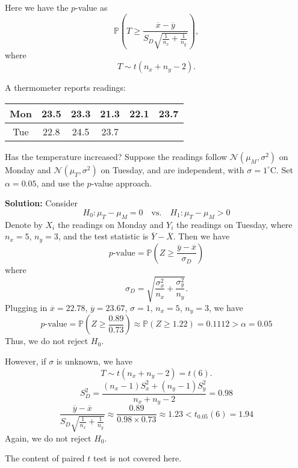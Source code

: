 Here we have the \(p\)-value as
\[
  \mathbb{P} \left( T \geq \frac{\overline{x} - \overline{y}}{S_D \sqrt{ \frac{1}{n_x} + \frac{1}{n_y} }} \right),
\]
where 
\[
  T \sim t(n_x + n_y - 2).
\]

\begin{eg}
  A thermometer reports readings: 
  \begin{table}[H]
    \centering
    \begin{tabular}{c|c|c|c|c|c}
        \toprule
        Mon & 23.5 & 23.3 & 21.3 & 22.1 & 23.7  \\
        \midrule
        Tue & 22.8 & 24.5 & 23.7 &  &   \\
        \bottomrule
    \end{tabular}
  \end{table}

  Has the temperature increased? Suppose the readings follow \(\mathcal{N}(\mu_M, \sigma^2)\) on Monday and \(\mathcal{N}(\mu_T, \sigma^2)\) on Tuesday, and are independent, with \(\sigma = 1^\circ \text{C}\). Set \(\alpha = 0.05\), and use the \(p\)-value approach.

  \textbf{Solution:} 
  Consider 
  \[
    H_0: \mu_T - \mu_M = 0 \quad \text{vs.} \quad H_1: \mu_T - \mu_M > 0
  \]
  Denote by \(X_i\) the readings on Monday and \(Y_i\) the readings on Tuesday, where \(n_x = 5\), \(n_y = 3\), and the test statistic is \(\overline{Y} - \overline{X}\). Then we have 
  \[
    p\text{-value} = \mathbb{P}\left(Z \geq \dfrac{\overline{y} - \overline{x}}{\sigma_D}\right)
  \]
  where 
  \[
    \sigma_D = \sqrt{\frac{\sigma_x^2}{n_x} + \frac{\sigma_y^2}{n_y}}.
  \]
  Plugging in \(\overline{x} = 22.78\), \(\overline{y} = 23.67\), \(\sigma = 1\), \(n_x = 5\), \(n_y = 3\), we have 
  \[
    p\text{-value} = \mathbb{P}\left(Z \geq \dfrac{0.89}{0.73}\right) \approx \mathbb{P}(Z \geq 1.22) = 0.1112 > \alpha = 0.05
  \]
  Thus, we do not reject \(H_0\). 

  However, if \(\sigma\) is unknown, we have 
  \[
    T \sim t(n_x + n_y - 2) = t(6).
  \]
  \[
    S_D^2 = \frac{(n_x - 1) S_x^2 + (n_y - 1) S_y^2}{n_x + n_y - 2} = 0.98
  \]
  \[
    \frac{\overline{y} - \overline{x}}{S_D \sqrt{ \frac{1}{n_x} + \frac{1}{n_y} }} \approx \dfrac{0.89}{0.98 \times 0.73} \approx 1.23 < t_{0.05}(6) = 1.94
  \]
  Again, we do not reject \(H_0\). 
\end{eg}

\begin{remark}
  The content of paired \(t\) test is not covered here. 
\end{remark}